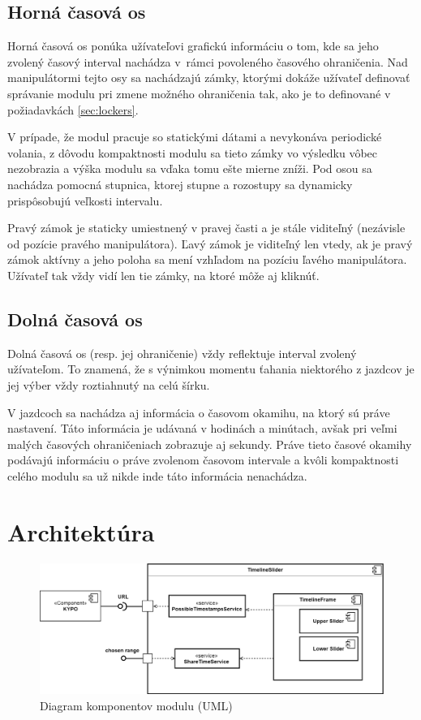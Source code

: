 \documentclass[
  printed, %
  twoside, %
  notable,   %
  nolof,   %
  nolot,   %
]{fithesis3}
\begin{document}
\subsection{Horná časová os}
Horná časová os ponúka užívateľovi grafickú informáciu o tom, kde sa jeho zvolený časový interval nachádza v~rámci povoleného časového ohraničenia. Nad manipulátormi tejto osy sa nachádzajú zámky, ktorými dokáže užívateľ definovať správanie modulu pri zmene možného ohraničenia tak, ako je to definované v požiadavkách \ref{sec:lockers}.

V prípade, že modul pracuje so statickými dátami a nevykonáva periodické volania, z dôvodu kompaktnosti modulu sa tieto zámky vo výsledku vôbec nezobrazia a výška modulu sa vďaka tomu ešte mierne zníži. Pod osou sa nachádza pomocná stupnica, ktorej stupne a rozostupy sa dynamicky prispôsobujú veľkosti intervalu.

Pravý zámok je staticky umiestnený v pravej časti a je stále viditeľný (nezávisle od pozície pravého manipulátora). Ľavý zámok je viditeľný len vtedy, ak je pravý zámok aktívny a jeho poloha sa mení vzhľadom na pozíciu ľavého manipulátora. Užívateľ tak vždy vidí len tie zámky, na ktoré môže aj kliknúť.

\subsection{Dolná časová os}
Dolná časová os (resp. jej ohraničenie) vždy reflektuje interval zvolený užívateľom. To znamená, že s výnimkou momentu ťahania niektorého z jazdcov je jej výber vždy roztiahnutý na celú šírku.

V jazdcoch sa nachádza aj informácia o časovom okamihu, na ktorý sú práve nastavení. Táto informácia je udávaná v hodinách a minútach, avšak pri veľmi malých časových ohraničeniach zobrazuje aj sekundy. Práve tieto časové okamihy podávajú informáciu o práve zvolenom časovom intervale a kvôli kompaktnosti celého modulu sa už nikde inde táto informácia nenachádza.

\section{Architektúra}
\begin{figure}[H]
	\center
	\includegraphics[width=0.90\linewidth]{component_diagram}
	\caption{Diagram komponentov modulu (UML)}
	\label{component_diagram}
\end{figure}
\end{document}
